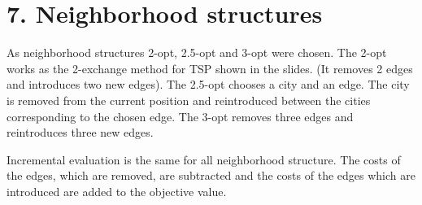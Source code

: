 \section*{7. Neighborhood structures}
As neighborhood structures 2-opt, 2.5-opt and 3-opt were chosen. The 2-opt works as the 2-exchange method for TSP shown in the slides. (It removes 2 edges and introduces two new edges). The 2.5-opt chooses a city and an edge. The city is removed from the current position and reintroduced between the cities corresponding to the chosen edge. The 3-opt removes three edges and reintroduces three new edges.

Incremental evaluation is the same for all neighborhood structure. The costs of the edges, which are removed, are subtracted and the costs of the edges which are introduced are added to the objective value.
